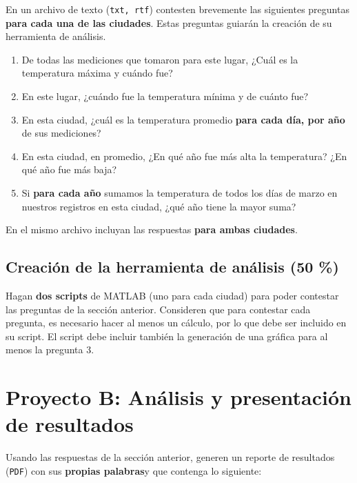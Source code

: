 \documentclass[]{article}
\theoremstyle{definition}
\begin{document}
En un archivo de texto (\texttt{txt, rtf}) contesten brevemente las siguientes preguntas \textbf{para cada una de las ciudades}.
Estas preguntas guiarán la creación de su herramienta de análisis.

\begin{enumerate}
    \item De todas las mediciones que tomaron para este lugar, ¿Cuál es la temperatura máxima y cuándo fue?
    \item En este lugar, ¿cuándo fue la temperatura mínima y de cuánto fue?
    \item En esta ciudad, ¿cuál es la temperatura promedio \textbf{para cada día, por año} de sus mediciones?
    \item En esta ciudad, en promedio, ¿En qué año fue más alta la temperatura? ¿En qué año fue más baja?
    \item Si \textbf{para cada año} sumamos la temperatura de todos los días de marzo en nuestros registros en esta ciudad, ¿qué año tiene la mayor suma?
\end{enumerate}

En el mismo archivo incluyan las respuestas \textbf{para ambas ciudades}.

\subsection{Creación de la herramienta de análisis (50 \%)}

Hagan \textbf{dos scripts} de MATLAB (uno para cada ciudad) para poder contestar las preguntas de la sección anterior.
Consideren que para contestar cada pregunta, es necesario hacer al menos un cálculo, por lo que debe ser incluido en su script.
El script debe incluir también la generación de una gráfica para al menos la pregunta 3.

\section{Proyecto B: Análisis y presentación de resultados}

Usando las respuestas de la sección anterior, generen un reporte de resultados (\texttt{PDF}) con sus \textbf{propias palabras}y que contenga lo siguiente:

\bigskip
\end{document}
